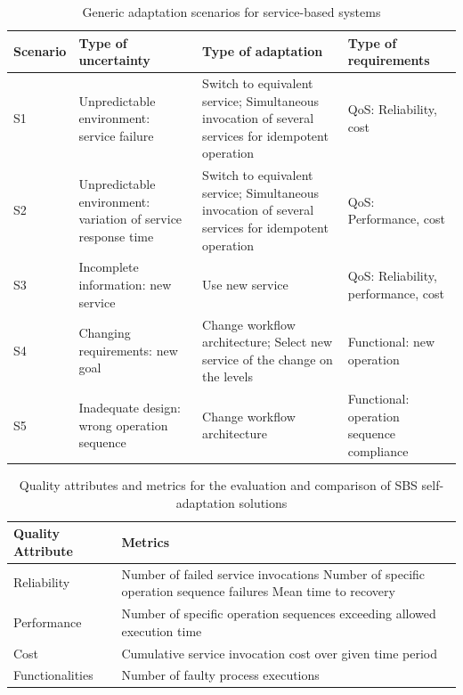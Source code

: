 \begin{table}[ht!b]
	\centering
	\begin{tabular}{|l|p{3.5cm}|p{3.5cm}|p{3.5cm}|}
		\hline 
		\textbf{Scenario} & \textbf{Type of uncertainty} & \textbf{Type of adaptation} & \textbf{Type of requirements}  \\
		\hline 
		S1 & Unpredictable environment: service failure  & Switch to equivalent service; Simultaneous invocation of several services for idempotent operation & QoS: Reliability, cost \\
		\hline 
		S2 & Unpredictable environment: variation of service response time & Switch to equivalent service; Simultaneous invocation of several services for idempotent operation & QoS: Performance, cost \\
		\hline 
		S3 & Incomplete information: new service & Use new service & QoS: Reliability, performance, cost \\ 
		\hline 
		S4 & Changing requirements: new goal & Change workflow architecture; Select new service of the change on the levels & Functional: new operation \\ 
		\hline 
		S5 & Inadequate design: wrong operation sequence & Change workflow architecture & Functional: operation sequence compliance \\ 
		\hline
		
	\end{tabular} 
	\caption[TAS Scenarios]{Generic adaptation scenarios for service-based systems}
	\label{tab:tas-scenarios}
\end{table}

\begin{table}[ht!b]
	\centering
	\begin{tabular}{|p{3cm}|p{10cm}|}
		\hline 
		\textbf{Quality Attribute} & \textbf{Metrics} \\ 
		\hline 
		Reliability & Number of failed service invocations
		Number of specific operation sequence failures
		Mean time to recovery \\ 
		\hline 
		Performance & Number of specific operation sequences exceeding allowed execution time \\ 
		\hline 
		Cost & Cumulative service invocation cost over given time period \\ 
		\hline 
		Functionalities & Number of faulty process executions \\ 
		\hline 
		
	\end{tabular} 
	\caption[TAS Metrics]{Quality attributes and metrics for the evaluation and comparison of SBS self-adaptation solutions}
	\label{tab:tas-metrics}
\end{table}

